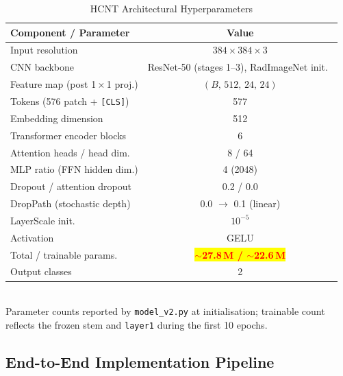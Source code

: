 \documentclass[conference]{IEEEtran}
\newcommand{\HCNT}{\textsc{HCNT}\xspace}
\newcommand{\RESULT}[1]{\colorbox{yellow}{\textcolor{red}{\textbf{#1}}}}
\begin{document}
\begin{table}[t]
  \centering
  \caption{\HCNT Architectural Hyperparameters}
  \label{tab:arch}
  \renewcommand{\arraystretch}{1.2}
  \begin{tabular}{lc}
    \toprule
    \textbf{Component / Parameter} & \textbf{Value} \\
    \midrule
    Input resolution              & $384 \times 384 \times 3$ \\
    CNN backbone                  & ResNet-50 (stages 1--3), RadImageNet init.\ \\
    Feature map (post 1\,$\times$\,1 proj.) & $(B,\,512,\,24,\,24)$ \\
    Tokens (576 patch + \texttt{[CLS]}) & 577 \\
    Embedding dimension           & 512 \\
    Transformer encoder blocks    & 6 \\
    Attention heads / head dim.   & 8 / 64 \\
    MLP ratio (FFN hidden dim.)   & 4 (2048) \\
    Dropout / attention dropout   & 0.2 / 0.0 \\
    DropPath (stochastic depth)   & 0.0 $\rightarrow$ 0.1 (linear) \\
    LayerScale init.\             & $10^{-5}$ \\
    Activation                    & GELU \\
    Total / trainable params.\    & \RESULT{$\sim$27.8\,M / $\sim$22.6\,M} \\
    Output classes                & 2 \\
    \bottomrule
  \end{tabular}
  \medskip\\
  \small Parameter counts reported by \texttt{model\_v2.py} at
  initialisation; trainable count reflects the frozen stem and \texttt{layer1}
  during the first 10 epochs. %
\end{table}

\subsection{End-to-End Implementation Pipeline}
\end{document}
